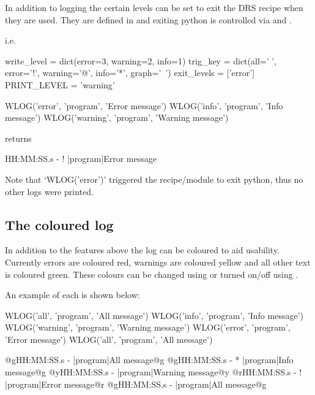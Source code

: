 \newpage 

\noindent In addition to logging the certain levels can be set to exit the DRS recipe when they are used. They are defined in  and exiting python is controlled via  and .

i.e. 
\begin{pythonbox}
write_level = dict(error=3, warning=2, info=1)
trig_key = dict(all=' ', error='!', warning='@', info='*', graph='~')
exit_levels = ['error']
PRINT_LEVEL = 'warning'

WLOG('error', 'program', 'Error message')
WLOG('info', 'program', 'Info message')
WLOG('warning', 'program', 'Warning message')

\end{pythonbox}
returns
\begin{cmdboxprint}
HH:MM:SS.s - ! |program|Error message
\end{cmdboxprint}
\begin{note}
Note that `WLOG('error')' triggered the recipe/module to exit python, thus no other logs were printed.
\end{note}

\subsection{The coloured log}
\label{ch:rules:drs_specific:coloured_log}

In addition to the features above the log can be coloured to aid usability.
Currently errors are coloured red, warnings are coloured yellow and all other text is coloured green. These colours can be changed using  or turned on/off using .

\vspace{0.5cm}

\noindent An example of each is shown below:
\begin{pythonbox}
WLOG('all', 'program', 'All message')
WLOG('info', 'program', 'Info message')
WLOG('warning', 'program', 'Warning message')
WLOG('error', 'program', 'Error message')
WLOG('all', 'program', 'All message')
\end{pythonbox}
\begin{cmdboxprintspecial}
@gHH:MM:SS.s -   |program|All message@g
@gHH:MM:SS.s - * |program|Info message@g
@yHH:MM:SS.s - \@ |program|Warning message@y
@rHH:MM:SS.s - ! |program|Error message@r
@gHH:MM:SS.s -   |program|All message@g
\end{cmdboxprintspecial}

